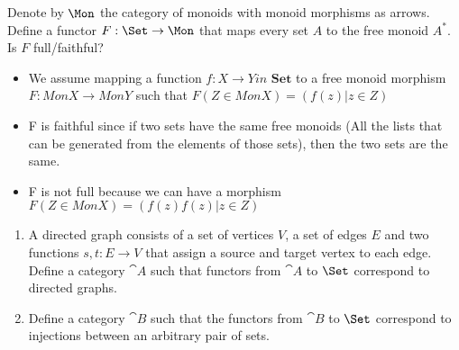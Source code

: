 \begin{exercise}
  Denote by $\Mon$ the category of monoids with monoid morphisms as arrows.
  Define a functor $F : \Set \to \Mon$ that maps every set $A$ to the free monoid $A^*$.
  Is $F$ full/faithful?
\end{exercise}

\begin{answer}
\begin{itemize}
\item We assume mapping a function $f: X \rightarrow Y in$ $\mathbf {Set}$ to a free monoid morphism $F: MonX \rightarrow MonY$ such that $F(Z \in MonX) = (f(z) | z \in Z)$
\item F is faithful since if two sets have the same free monoids (All the lists that can be generated from the elements of those sets), then the two sets are the same.
\item F is not full because we can have a morphism $F(Z \in MonX) = (f(z)f(z) | z \in Z)$
\end{itemize}
\end{answer}

\begin{exercise}
  \begin{enumerate}
    \item A directed graph consists of a set of vertices $V$, a set of edges $E$ and two functions $s, t : E \to V$ that assign a source and target vertex to each edge.
      Define a category $\cat{A}$ such that functors from $\cat{A}$ to $\Set$ correspond to directed graphs.
    \item Define a category $\cat{B}$ such that the functors from $\cat{B}$ to $\Set$ correspond to injections between an arbitrary pair of sets.
  \end{enumerate}
\end{exercise}


